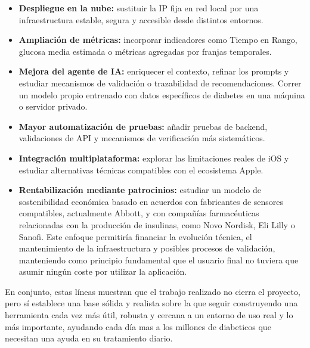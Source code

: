 \begin{itemize}
    \item \textbf{Despliegue en la nube:} sustituir la IP fija en red local por una
          infraestructura estable, segura y accesible desde distintos entornos.
    \item \textbf{Ampliación de métricas:} incorporar indicadores como Tiempo en Rango,
          glucosa media estimada o métricas agregadas por franjas temporales.
    \item \textbf{Mejora del agente de IA:} enriquecer el contexto, refinar los prompts y
          estudiar mecanismos de validación o trazabilidad de recomendaciones. Correr un modelo propio entrenado con datos específicos de diabetes en una máquina o servidor privado.
    \item \textbf{Mayor automatización de pruebas:} añadir pruebas de backend, validaciones
          de API y mecanismos de verificación más sistemáticos.
    \item \textbf{Integración multiplataforma:} explorar las limitaciones reales de iOS y
          estudiar alternativas técnicas compatibles con el ecosistema Apple.
     \item \textbf{Rentabilización mediante patrocinios:} estudiar un modelo de
          sostenibilidad económica basado en acuerdos con fabricantes de sensores
          compatibles, actualmente Abbott, y con compañías farmacéuticas relacionadas con
          la producción de insulinas, como Novo Nordisk, Eli Lilly o Sanofi. Este enfoque
          permitiría financiar la evolución técnica, el mantenimiento de la infraestructura
          y posibles procesos de validación, manteniendo como principio fundamental que el
          usuario final no tuviera que asumir ningún coste por utilizar la aplicación.
\end{itemize}

En conjunto, estas líneas muestran que el trabajo realizado no cierra el proyecto, pero sí
establece una base sólida y realista sobre la que seguir construyendo una herramienta cada
vez más útil, robusta y cercana a un entorno de uso real y lo más importante, ayudando cada día mas a los millones de diabeticos que necesitan una ayuda en su tratamiento diario.
